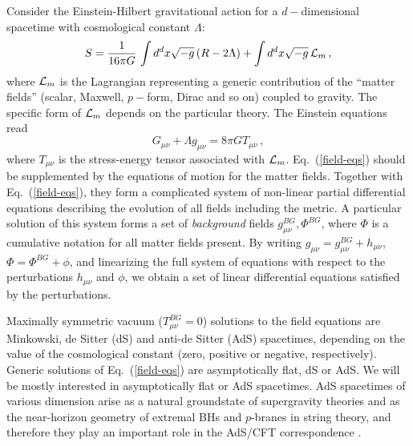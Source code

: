 \documentclass[]{iopart}
\def\be{\begin{equation}}
\def\ee{\end{equation}}
\begin{document}
Consider the Einstein-Hilbert gravitational action for a $d-$dimensional
spacetime with cosmological constant $\Lambda$:
%
\be S=\frac{1}{16\pi G}\, \int d^dx\sqrt{-g}
\left( R - 2 \Lambda\right) + \int  d^dx\sqrt{-g} \, {\cal L}_m\,, 
\label{action}
\ee
%
where ${\cal L}_m$ is the Lagrangian representing a generic contribution of
the ``matter fields'' (scalar, Maxwell, $p-$form, Dirac and so on) coupled to
gravity. The specific form of ${\cal L}_m$ depends on the particular theory.
The Einstein equations read
%
\be
G_{\mu\nu} + \Lambda g_{\mu\nu} = 8 \pi G T_{\mu\nu}\,,
\label{field-eqs}
\ee 
%
where $T_{\mu\nu}$ is the stress-energy tensor associated with ${\cal L}_m$.
Eq.~(\ref{field-eqs}) should be supplemented by the equations of motion for
the matter fields. Together with Eq.~(\ref{field-eqs}), they form a
complicated system of non-linear partial differential equations describing the
evolution of all fields including the metric.  A particular solution of this
system forms a set of {\it background} fields ${g_{\mu\nu}^{BG}, \Phi^{BG}}$,
where $\Phi$ is a cumulative notation for all matter fields present. By
writing $g_{\mu\nu} = g_{\mu\nu}^{BG} + h_{\mu\nu}$, $\Phi = \Phi^{BG} +
\phi$, and linearizing the full system of equations with respect to the
perturbations $h_{\mu\nu}$ and $\phi$, we obtain a set of linear differential
equations satisfied by the perturbations.

Maximally symmetric vacuum ($T_{\mu\nu}^{BG}=0$) solutions to the field
equations are Minkowski, de Sitter (dS) and anti-de Sitter (AdS) spacetimes,
depending on the value of the cosmological constant (zero, positive or
negative, respectively).  Generic solutions of Eq.~(\ref{field-eqs}) are
asymptotically flat, dS or AdS.  We will be mostly interested in
asymptotically flat or AdS spacetimes. AdS spacetimes of various dimension
arise as a natural groundstate of supergravity theories and as the
near-horizon geometry of extremal BHs and $p$-branes in string theory, and
therefore they play an important role in the AdS/CFT correspondence
\cite{Aharony:1999ti,Klebanov:2000me,Maldacena:2003nj,Duff:1999rk,Cotsakis:2000bb}.
\end{document}
